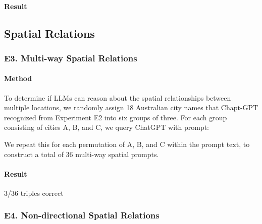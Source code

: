 \paragraph{Result}



\subsection{Spatial Relations} %

\subsubsection{E3. Multi-way Spatial Relations}
\paragraph{Method}
To determine if LLMs can reason about the spatial relationships between multiple locations, we randomly assign 18 Australian city names that Chapt-GPT recognized from Experiment E2 into six groups of three.
For each group consisting of cities A, B, and C, we query ChatGPT with prompt: 
\begin{center}
\end{center}

We repeat this for each permutation of A, B, and C within the prompt text, to construct a total of 36 multi-way spatial prompts.

\paragraph{Result}
3/36 triples correct


\subsubsection{E4. Non-directional Spatial Relations}

